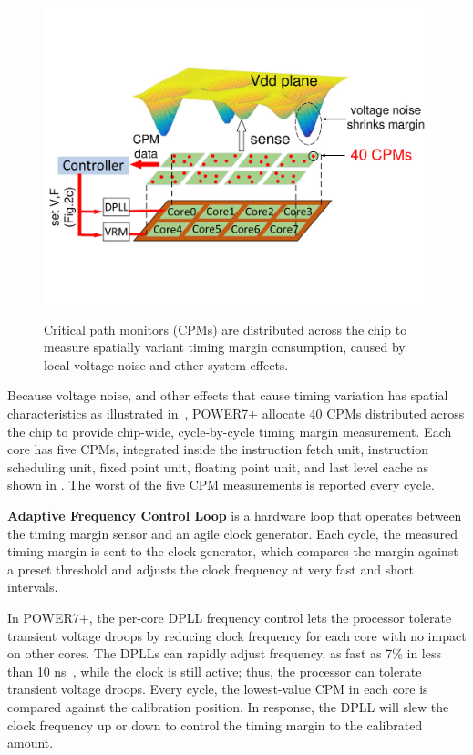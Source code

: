 \begin{figure}[t]
\centering
   \includegraphics[trim=0 250 0 260,clip,width=.8\linewidth]{graphs/voltage/control-loop.pdf}
   \label{fig:spatial-noise} 

\caption{Critical path monitors (CPMs) are distributed across the chip to measure spatially variant timing margin consumption, caused by local voltage noise and other system effects.}
\end{figure}

Because voltage noise, and other effects that cause timing variation has spatial characteristics as illustrated in~\cite{fig:spatial-noise}, POWER7+ allocate 40 CPMs distributed across the chip to provide chip-wide, cycle-by-cycle timing margin measurement. Each core has five CPMs, integrated inside the instruction fetch unit, instruction scheduling unit, fixed point unit, floating point unit, and last level cache as shown in . The worst of the five CPM measurements is reported every cycle.

\textbf{Adaptive Frequency Control Loop} is a hardware loop that operates between the timing margin sensor and an agile clock generator. Each cycle, the measured timing margin is sent to the clock generator, which compares the margin against a preset threshold and adjusts the clock frequency at very fast and short intervals.

In POWER7+, the per-core DPLL frequency control lets the processor tolerate transient voltage droops by reducing clock frequency for each core with no impact on other cores. The DPLLs can rapidly adjust frequency, as fast as 7\% in less than 10 ns~\cite{vezyrtzis2018droop}, while the clock is still active; thus, the processor can tolerate transient voltage droops. Every cycle, the lowest-value CPM in each core is compared against the calibration position. In response, the DPLL will slew the clock frequency up or down to control the timing margin to the calibrated amount. 

